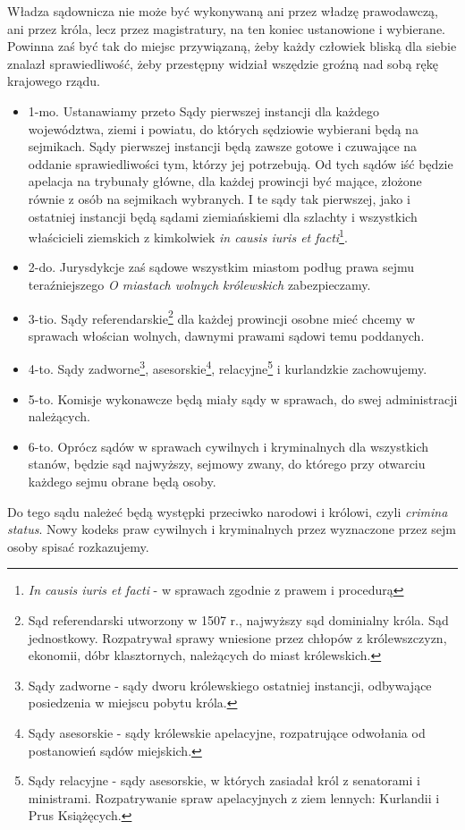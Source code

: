 \documentclass{book}
\begin{document}
 Władza sądownicza nie może być wykonywaną ani przez władzę prawodawczą, ani przez króla, lecz przez magistratury, na ten koniec ustanowione i wybierane. Powinna zaś być tak do miejsc przywiązaną, żeby każdy człowiek bliską dla siebie znalazł sprawiedliwość, żeby przestępny widział wszędzie groźną nad sobą rękę krajowego rządu.  
\begin{itemize}
	\item 1-mo. Ustanawiamy przeto Sądy pierwszej instancji dla każdego województwa, ziemi i powiatu, do których sędziowie wybierani będą na sejmikach.  Sądy pierwszej instancji będą zawsze gotowe i czuwające na oddanie sprawiedliwości tym, którzy jej potrzebują.  Od tych sądów iść będzie apelacja na trybunały główne, dla każdej prowincji być mające, złożone równie z osób na sejmikach wybranych.  I te sądy tak pierwszej, jako i ostatniej instancji będą sądami ziemiańskiemi dla szlachty i wszystkich właścicieli ziemskich z kimkolwiek  \textit{in causis iuris et facti}\footnote{\textit{In causis iuris et facti} - w sprawach zgodnie z prawem i procedurą}. 
\item 2-do. Jurysdykcje zaś sądowe wszystkim miastom podług prawa sejmu teraźniejszego \textit{O miastach wolnych królewskich} zabezpieczamy. 
\item 3-tio. Sądy referendarskie\footnote{Sąd referendarski utworzony w 1507 r., najwyższy sąd dominialny króla.  Sąd jednostkowy. Rozpatrywał sprawy wniesione przez chłopów z królewszczyzn, ekonomii, dóbr klasztornych, należących do miast królewskich.} dla każdej prowincji osobne mieć chcemy w sprawach włościan wolnych, dawnymi prawami sądowi temu poddanych.  
\item 4-to. Sądy zadworne\footnote{Sądy zadworne - sądy dworu królewskiego ostatniej instancji, odbywające posiedzenia w miejscu pobytu króla.}, asesorskie\footnote{Sądy asesorskie - sądy królewskie apelacyjne, rozpatrujące odwołania od postanowień sądów miejskich.}, relacyjne\footnote{Sądy relacyjne - sądy asesorskie, w których zasiadał król z senatorami i ministrami. Rozpatrywanie spraw apelacyjnych z ziem lennych: Kurlandii i Prus Książęcych.} i kurlandzkie zachowujemy. 
\item 5-to. Komisje wykonawcze będą miały sądy w sprawach, do swej administracji należących.  
\item 6-to. Oprócz sądów w sprawach cywilnych i kryminalnych dla wszystkich stanów, będzie sąd najwyższy, sejmowy zwany, do którego przy otwarciu każdego sejmu obrane będą osoby. 
\end{itemize}
Do tego sądu należeć będą występki przeciwko narodowi i królowi, czyli \textit{crimina status}. Nowy kodeks praw cywilnych i kryminalnych przez wyznaczone przez sejm osoby spisać rozkazujemy.  
\end{document}
